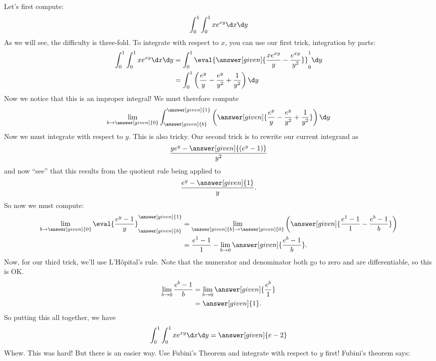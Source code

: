 \documentclass{ximera}
\begin{document}
\begin{example}
\begin{image}
  \end{image}
  \begin{explanation}
    Let's first compute:
    \[
    \int_0^1 \int_0^1 x e^{xy} \d x \d y
    \]
    As we will see, the difficulty is three-fold. To integrate with
    respect to $x$, you can use our first trick, integration by parts:
    \begin{align*}
      \int_0^1 \int_0^1 x e^{xy} \d x \d y &= \int_0^1 \eval{\answer[given]{\frac{xe^{xy}}{y}-\frac{e^{xy}}{y^2}}}_0^1\d y\\
      &= \int_0^1 \left(\frac{e^{y}}{y}-\frac{e^y}{y^2} + \frac{1}{y^2}\right)\d y
    \end{align*}
    Now we notice that this is an improper integral!
    We must therefore compute
    \[
    \lim_{b\to\answer[given]{0}}\int_{\answer[given]{b}}^{\answer[given]{1}} \left(\answer[given]{\frac{e^{y}}{y}-\frac{e^y}{y^2} + \frac{1}{y^2}}\right)\d y
    \]
    Now we must integrate with respect to $y$. This is also
    tricky. Our second trick is to rewrite our current integrand as
    \[
    \frac{y e^y - \answer[given]{(e^y -1)}}{y^2}
    \]
    and now ``see'' that this results from the quotient rule being
    applied to
    \[
    \frac{e^y-\answer[given]{1}}{y}.
    \]
    So now we must compute:
    \begin{align*}
      \lim_{b\to \answer[given]{0}}\eval{\frac{e^y-1}{y}}_{\answer[given]{b}}^{\answer[given]{1}} &= \lim_{\answer[given]{b}\to \answer[given]{0}}\left(\answer[given]{\frac{e^1-1}{1}-\frac{e^b-1}{b}}\right)\\
      &= \frac{e^1-1}{1}-\lim_{b\to 0}\answer[given]{\frac{e^b-1}{b}}.
    \end{align*}
    Now, for our third trick, we'll use L'H\^opital's rule. Note that
    the numerator and denominator both go to zero and are
    differentiable, so this is OK.
    \begin{align*}
    \lim_{b\to 0}\frac{e^b-1}{b} &= \lim_{b\to 0}\answer[given]{\frac{e^b}{1}}\\
    &= \answer[given]{1}.
    \end{align*}
    So putting this all together, we have
    \[
    \int_0^1 \int_0^1 x e^{xy} \d x \d y = \answer[given]{e-2}
    \]
    Whew. This was hard! But there is an easier way. Use Fubini's
    Theorem and integrate with respect to $y$ first! Fubini's theorem says:

\end{explanation}
\end{example}
\end{document}
